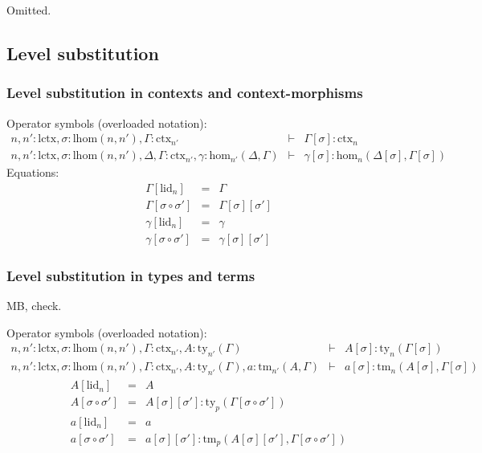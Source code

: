 \documentclass[11pt,a4paper]{article}
\theoremstyle{definition}
\def\lhom{\mathrm{lhom}}
\def\Hom{\mathrm{hom}}
\def\lctx{\mathrm{lctx}}
\def\lid{\mathrm{lid}}
\newcommand{\ctx}{\mathrm{ctx}}
\newcommand{\ty}{\mathrm{ty}}
\newcommand{\tm}{\mathrm{tm}}
\begin{document}
Omitted.

\subsection{Level substitution}

\subsubsection{Level substitution in contexts and context-morphisms}

Operator symbols (overloaded notation):
\begin{eqnarray*}
n, n' : \lctx , \sigma : \lhom(n,n'), \Gamma : \ctx_{n'} &\vdash& 
\Gamma[\sigma] : \ctx_n\\
n, n' : \lctx , \sigma : \lhom(n,n'), \Delta,\Gamma : \ctx_{n'}, \gamma : \Hom_{n'}(\Delta,\Gamma) 
&\vdash& 
\gamma[\sigma] : \Hom_{n}(\Delta[\sigma],\Gamma[\sigma]) 
\end{eqnarray*}
Equations:
\begin{eqnarray*}
\Gamma[\lid_n] &=& \Gamma\\
\Gamma[\sigma \circ \sigma'] &=& \Gamma[\sigma][\sigma']\\
\gamma[\lid_n] &=& \gamma\\
\gamma[\sigma \circ \sigma'] &=& \gamma[\sigma][\sigma']
\end{eqnarray*}

\subsubsection{Level substitution in types and terms}

MB, check.

Operator symbols (overloaded notation):
\begin{eqnarray*}
n, n' : \lctx , \sigma : \lhom(n,n'), \Gamma : \ctx_{n'}, A:\ty_{n'}(\Gamma)
&\vdash& 
A[\sigma]: \ty_n(\Gamma[\sigma])\\
n,n' : \lctx , \sigma : \lhom(n,n'), \Gamma : \ctx_{n'}, A:\ty_{n'}(\Gamma), a : \tm_{n'}(A,\Gamma) 
&\vdash& 
a[\sigma] : \tm_{n}(A[\sigma],\Gamma[\sigma]) 
\end{eqnarray*}
\begin{eqnarray*}
A[\lid_n] &=& A\\
A[\sigma \circ \sigma'] &=& A[\sigma][\sigma']: \ty_p(\Gamma[\sigma \circ \sigma'])\\
a[\lid_n] &=& a\\
a[\sigma \circ \sigma'] &=& a[\sigma][\sigma']: \tm_p(A[\sigma][\sigma'],\Gamma[\sigma \circ \sigma'])
\end{eqnarray*}
\end{document}
